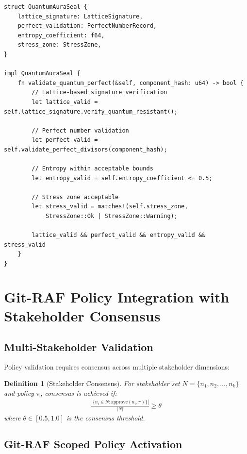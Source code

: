 \documentclass[a4paper,12pt]{article}
\newtheorem{definition}{Definition}
\begin{document}
\begin{lstlisting}[style=rustcode, caption={Quantum-resistant AuraSeal implementation}]
struct QuantumAuraSeal {
    lattice_signature: LatticeSignature,
    perfect_validation: PerfectNumberRecord,
    entropy_coefficient: f64,
    stress_zone: StressZone,
}

impl QuantumAuraSeal {
    fn validate_quantum_perfect(&self, component_hash: u64) -> bool {
        // Lattice-based signature verification
        let lattice_valid = self.lattice_signature.verify_quantum_resistant();
        
        // Perfect number validation
        let perfect_valid = self.validate_perfect_divisors(component_hash);
        
        // Entropy within acceptable bounds
        let entropy_valid = self.entropy_coefficient <= 0.5;
        
        // Stress zone acceptable
        let stress_valid = matches!(self.stress_zone, 
            StressZone::Ok | StressZone::Warning);
        
        lattice_valid && perfect_valid && entropy_valid && stress_valid
    }
}
\end{lstlisting}

\section{Git-RAF Policy Integration with Stakeholder Consensus}

\subsection{Multi-Stakeholder Validation}

Policy validation requires consensus across multiple stakeholder dimensions:

\begin{definition}[Stakeholder Consensus]
For stakeholder set $N = \{n_1, n_2, \ldots, n_k\}$ and policy $\pi$, consensus is achieved if:
\begin{align}
\frac{|\{n_i \in N : \text{approve}(n_i, \pi)\}|}{|N|} \geq \theta
\end{align}
where $\theta \in [0.5, 1.0]$ is the consensus threshold.
\end{definition}

\subsection{Git-RAF Scoped Policy Activation}
\end{document}
